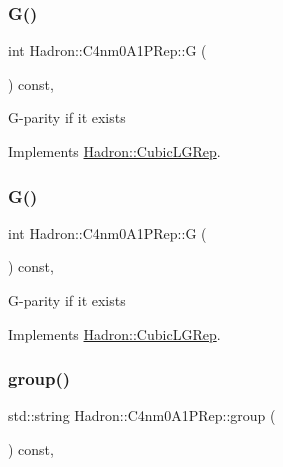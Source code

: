 \subsubsection{\texorpdfstring{G()}{G()}\hspace{0.1cm}{\footnotesize\ttfamily [2/3]}}
{\footnotesize\ttfamily int Hadron\+::\+C4nm0\+A1\+P\+Rep\+::G (\begin{DoxyParamCaption}{ }\end{DoxyParamCaption}) const\hspace{0.3cm}{\ttfamily [inline]}, {\ttfamily [virtual]}}

G-\/parity if it exists 

Implements \mbox{\hyperlink{structHadron_1_1CubicLGRep_ace26f7b2d55e3a668a14cb9026da5231}{Hadron\+::\+Cubic\+L\+G\+Rep}}.

\mbox{\label{structHadron_1_1C4nm0A1PRep_a052b607d24099af097a92cb8c1191a1e}} 
\subsubsection{\texorpdfstring{G()}{G()}\hspace{0.1cm}{\footnotesize\ttfamily [3/3]}}
{\footnotesize\ttfamily int Hadron\+::\+C4nm0\+A1\+P\+Rep\+::G (\begin{DoxyParamCaption}{ }\end{DoxyParamCaption}) const\hspace{0.3cm}{\ttfamily [inline]}, {\ttfamily [virtual]}}

G-\/parity if it exists 

Implements \mbox{\hyperlink{structHadron_1_1CubicLGRep_ace26f7b2d55e3a668a14cb9026da5231}{Hadron\+::\+Cubic\+L\+G\+Rep}}.

\mbox{\label{structHadron_1_1C4nm0A1PRep_a0c0892a28bdda298fc36d578c433f30e}} 
\subsubsection{\texorpdfstring{group()}{group()}\hspace{0.1cm}{\footnotesize\ttfamily [1/3]}}
{\footnotesize\ttfamily std\+::string Hadron\+::\+C4nm0\+A1\+P\+Rep\+::group (\begin{DoxyParamCaption}{ }\end{DoxyParamCaption}) const\hspace{0.3cm}{\ttfamily [inline]}, {\ttfamily [virtual]}}

